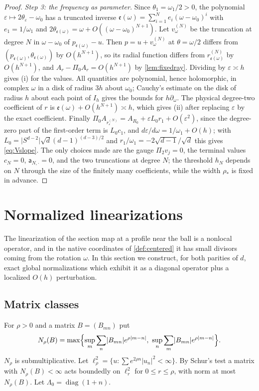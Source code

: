 \documentclass[11pt]{amsart}
\numberwithin{equation}{section}
\theoremstyle{definition}
\theoremstyle{remark}
\newcommand{\eps}{\varepsilon}
\newcommand{\abs}[1]{\lvert #1\rvert}
\begin{document}
\begin{proof}
\emph{Step 3: the frequency as parameter.} Since $\theta_1=\omega_1/2>0$, the polynomial $\eps\mapsto2\theta_\eps-\omega_0$ has a truncated inverse $\mathfrak e(\omega)=\sum_{i=1}^Ne_i(\omega-\omega_0)^i$ with $e_1=1/\omega_1$ and $2\theta_{\mathfrak e(\omega)}=\omega+O((\omega-\omega_0)^{N+1})$. Let $v^{(N)}_\omega$ be the truncation at degree $N$ in $\omega-\omega_0$ of $p_{\mathfrak e(\omega)}-u$. Then $p=u+v^{(N)}_\omega$ at $\theta=\omega/2$ differs from $(p_{\mathfrak e(\omega)},\theta_{\mathfrak e(\omega)})$ by $O(h^{N+1})$, so its radial function differs from $r^{(N)}_{\mathfrak e(\omega)}$ by $O(h^{N+1})$, and $A_r-\Pi_0A_r=O(h^{N+1})$ by \cref{lem:fixedray}. Dividing by $\eps\asymp h$ gives (i) for the values. All quantities are polynomial, hence holomorphic, in complex $\omega$ in a disk of radius $3h$ about $\omega_0$; Cauchy's estimate on the disk of radius $h$ about each point of $I_h$ gives the bounds for $h\partial_\omega$. The physical degree-two coefficient of $r$ is $\mathfrak e(\omega)+O(h^{N+1})\asymp h$, which gives (ii) after replacing $\eps$ by the exact coefficient. Finally $\Pi_0A_{r^{(N)}_\eps}=A_{R_0}+\eps L_0r_1+O(\eps^2)$, since the degree-zero part of the first-order term is $L_0c_1$, and $d\eps/d\omega=1/\omega_1+O(h)$; with $L_0=\abs{S^{d-2}}\sqrt d(d-1)^{(d-3)/2}$ and $r_1/\omega_1=-2\sqrt{d-1}/\sqrt d$ this gives \eqref{eq:Vslope}. The only choices made are the gauge $\Pi_2v_j=0$, the terminal values $c_N=0$, $\mathsf a_{N,\cdot}=0$, and the two truncations at degree $N$; the threshold $h_N$ depends on $N$ through the size of the finitely many coefficients, while the width $\rho_*$ is fixed in advance.
\end{proof}

\section{Normalized linearizations}\label{sec:normalization}

The linearization of the section map at a profile near the ball is a nonlocal operator, and in the native coordinates of \cref{def:centered} it has small divisors coming from the rotation $\omega$. In this section we construct, for both parities of $d$, exact global normalizations which exhibit it as a diagonal operator plus a localized $O(h)$ perturbation.

\subsection{Matrix classes}
For $\rho>0$ and a matrix $B=(B_{mn})$ put
\[
N_\rho(B)=\max\Bigl\{\sup_m\sum_n\abs{B_{mn}}e^{\rho\abs{m-n}},\ \sup_n\sum_m\abs{B_{mn}}e^{\rho\abs{m-n}}\Bigr\}.
\]
$N_\rho$ is submultiplicative. Let $\ell^2_\rho=\{u:\sum e^{2\rho n}\abs{u_n}^2<\infty\}$. By Schur's test a matrix with $N_\rho(B)<\infty$ acts boundedly on $\ell^2_{r}$ for $0\le r\le\rho$, with norm at most $N_\rho(B)$. Let $\Lambda_0=\operatorname{diag}(1+n)$.
\end{document}
